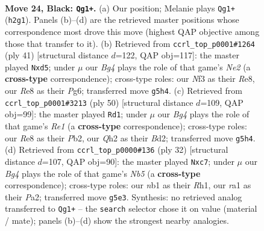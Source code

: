 \documentclass[11pt]{article}
\begin{document}
\clearpage

\begin{figure}[p]\centering
\begin{subfigure}{0.46\textwidth}\centering
\resizebox{\linewidth}{!}{%
\newchessgame
\chessboard[
  setfen={r3r3/1ppb2kp/5p2/p2p2b1/6P1/NPB1Pn2/P4P1q/RNR2K2 b - - 1 24},
  showmover=false,
  pgfstyle=straightmove, color=movearrow, markmove={h2-g1}
]}
\caption{}
\end{subfigure}\hfill
\begin{subfigure}{0.46\textwidth}\centering
\resizebox{\linewidth}{!}{%
\newchessgame
\chessboard[
  setfen={2r1r1k1/1b2npbp/p2p2p1/3P4/2p1NB2/7P/PP1N1PP1/1R2R1K1 b - - 0 21},
  showmover=false,
  pgfstyle=straightmove, color=movearrow, markmove={e7-d5}
]}
\caption{}
\end{subfigure}
\\[4pt]
\begin{subfigure}{0.46\textwidth}\centering
\resizebox{\linewidth}{!}{%
\newchessgame
\chessboard[
  setfen={r3r1k1/4bpp1/np1p2np/pN1P4/P4P2/1N5P/1P1B2P1/4RRK1 w - - 0 26},
  showmover=false,
  pgfstyle=straightmove, color=movearrow, markmove={e1-d1}
]}
\caption{}
\end{subfigure}\hfill
\begin{subfigure}{0.46\textwidth}\centering
\resizebox{\linewidth}{!}{%
\newchessgame
\chessboard[
  setfen={rn3rk1/ppp1pp2/1n4p1/1N2b1B1/8/1B6/P1R2PPP/4K2R w K - 2 17},
  showmover=false,
  pgfstyle=straightmove, color=movearrow, markmove={b5-c7}
]}
\caption{}
\end{subfigure}
\caption{\textbf{Move 24, Black: \texttt{Qg1+}.} (a) Our position; Melanie plays \texttt{Qg1+} (\texttt{h2g1}). Panels (b)--(d) are the retrieved master positions whose correspondence most drove this move (highest QAP objective among those that transfer to it). (b) Retrieved from \texttt{ccrl\_top\_p0001\#1264} (ply 41) [structural distance $d$=122, QAP obj=117]: the master played \texttt{Nxd5}; under $\mu$ our \emph{Bg4} plays the role of that game's \emph{Ne2} (a \textbf{cross-type} correspondence); cross-type roles: our \emph{N}f3 as their \emph{R}e8, our \emph{R}e8 as their \emph{P}g6; transferred move \texttt{g5h4}. (c) Retrieved from \texttt{ccrl\_top\_p0001\#3213} (ply 50) [structural distance $d$=109, QAP obj=99]: the master played \texttt{Rd1}; under $\mu$ our \emph{Bg4} plays the role of that game's \emph{Re1} (a \textbf{cross-type} correspondence); cross-type roles: our \emph{R}e8 as their \emph{P}b2, our \emph{Q}h2 as their \emph{B}d2; transferred move \texttt{g5h4}. (d) Retrieved from \texttt{ccrl\_top\_p0000\#136} (ply 32) [structural distance $d$=107, QAP obj=90]: the master played \texttt{Nxc7}; under $\mu$ our \emph{Bg4} plays the role of that game's \emph{Nb5} (a \textbf{cross-type} correspondence); cross-type roles: our \emph{n}b1 as their \emph{R}h1, our \emph{r}a1 as their \emph{P}a2; transferred move \texttt{g5e3}. Synthesis: no retrieved analog transferred to \texttt{Qg1+} -- the \texttt{search} selector chose it on value (material / mate); panels (b)--(d) show the strongest nearby analogies.}
\label{fig:thought-m47}
\end{figure}
\end{document}
